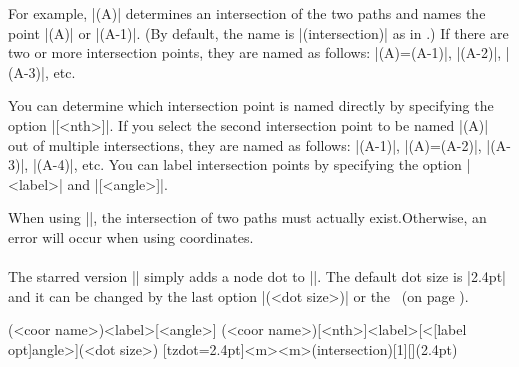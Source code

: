 For example, |(A)| determines an intersection of the two paths and names the point |(A)| or |(A-1)|. (By default, the name is |(intersection)| as in \Tikz.)
If there are two or more intersection points, they are named as follows: |(A)=(A-1)|, |(A-2)|, |(A-3)|, etc.

You can determine which intersection point is named directly by specifying the option |[<nth>]|. If you select the second intersection point to be named |(A)| out of multiple intersections, they are named as follows: |(A-1)|, |(A)=(A-2)|, |(A-3)|, |(A-4)|, etc.
You can label intersection points by specifying the option |{<label>}| and |[<angle>]|.


\begin{tzcode}{.3}
{}
\end{tzcode}

\warning When using |\tzXpoint|, the intersection of two paths must actually exist.Otherwise, an error will occur when using coordinates.

\paragraph{\icmd{\tzXpoint*}} The starred version |\tzXpoint*| simply adds a node dot to |\tzXpoint|.
The default dot size is |2.4pt| and it can be changed by the last option |(<dot size>)| or the \threeways\ (on page \pageref{ss:threeways}).

\begin{tzdef}
(<coor name>){<label>}[<angle>]
          (<coor name>)[<nth>]{<label>}[<[label opt]angle>](<dot size>)
  [tzdot=2.4pt]{<m>}{<m>}(intersection)[1]{}[](2.4pt)
\end{tzdef}


\begin{tzcode}{.3}
{}
\end{tzcode}


